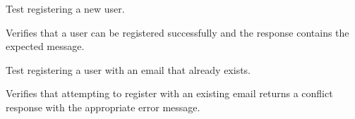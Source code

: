 \documentclass[letterpaper,10pt,openany,oneside,english]{sphinxmanual}
\begin{document}
\begin{savenotes}\begin{fulllineitems}
\label{\detokenize{modules/tests:storeapi.tests.routers.test_user.test_register_user}}
\pysigstartsignatures
{}
\pysigstopsignatures
\sphinxAtStartPar
Test registering a new user.

\sphinxAtStartPar
Verifies that a user can be registered successfully and the response
contains the expected message.

\end{fulllineitems}\end{savenotes}


\begin{savenotes}\begin{fulllineitems}
\label{\detokenize{modules/tests:storeapi.tests.routers.test_user.test_register_user_already_exists}}
\pysigstartsignatures
{}
\pysigstopsignatures
\sphinxAtStartPar
Test registering a user with an email that already exists.

\sphinxAtStartPar
Verifies that attempting to register with an existing email returns
a conflict response with the appropriate error message.

\end{fulllineitems}\end{savenotes}
\end{document}
